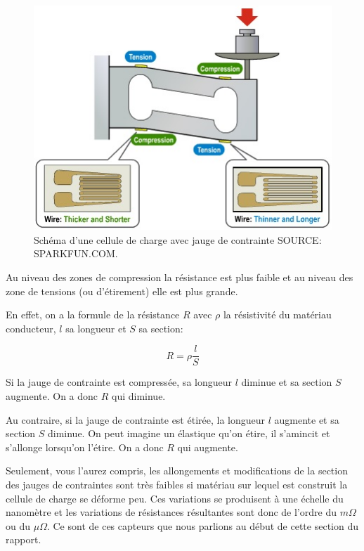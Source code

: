 \documentclass{polytech/polytech}
\begin{document}
\begin{figure}
\begin{center}
\includegraphics[scale=1]{image/load_cell.jpg}
\end{center}
\caption{Schéma d'une cellule de charge avec jauge de contrainte SOURCE: SPARKFUN.COM.}
\label{fig:load_cell_sparkfun}
\end{figure}

Au niveau des zones de compression la résistance est plus faible et au niveau des zone de tensions (ou d'étirement) elle est plus grande.

En effet, on a la formule de la résistance $R$ avec $\rho$ la résistivité du matériau conducteur, $l$ sa longueur et $S$ sa section: 

\begin{equation}
R= \rho \frac{l}{S}
\end{equation}

Si la jauge de contrainte est compressée, sa longueur $l$ diminue et sa section $S$ augmente. On a donc $R$ qui diminue.

Au contraire, si la jauge de contrainte est étirée, la longueur $l$ augmente et sa section $S$ diminue. On peut imagine un élastique qu'on étire, il s'amincit et s'allonge lorsqu'on l'étire.  On a donc $R$ qui augmente.

Seulement, vous l'aurez compris, les allongements et modifications de la section des jauges de contraintes sont très faibles si matériau sur lequel est construit la cellule de charge se déforme peu. Ces variations se produisent à une échelle du nanomètre et les variations de résistances résultantes sont donc de l'ordre du $m\Omega$ ou du $\mu\Omega$. Ce sont de ces capteurs que nous parlions au début de cette section du rapport.
\end{document}
